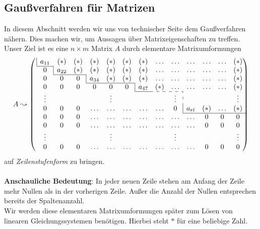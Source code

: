 \newpage

\subsection{Gaußverfahren für Matrizen}
In diesem Abschnitt werden wir uns von technischer Seite dem Gaußverfahren nähern.
Dies machen wir, um Aussagen über Matrixeigenschaften zu treffen.
Unser Ziel ist es eine $n \times m$ Matrix $A$ durch elementare Matrixumformungen 
\begin{align*}
A \leadsto
\left(\mkern3mu
    \begin{array}{*{13}c}
      \multicolumn{1}{|c}{a_{11}} & (*) & (*) & (*) & (*) & (*) & (*) & \ldots & \ldots & \ldots & \ldots & \ldots & (*) \\
      \cline{1-1}
      0 & \multicolumn{1}{|c}{a_{22}} & (*) & (*) & (*) & (*) & (*)  & \ldots & \ldots & \ldots & \ldots & \ldots & (*) \\
      \cline{2-3}
      0 & 0 & 0 & \multicolumn{1}{|c}{a_{34}} & (*) & (*) & (*) & \ldots & \ldots & \ldots & \ldots & \ldots & (*)\\
      \cline{4-6}
      0 & 0 & 0 & 0 & 0 & 0 & \multicolumn{1}{|c}{a_{47}} & (*) & \ldots & \ldots & \ldots & \ldots & (*) \\
      \cline{7-7}\cdashline{8-9}
      \vdots & & & & \vdots & & & & \vdots & \multicolumn{1}{:c}{} & & & \vdots \\
      0 & 0 & 0 & \ldots & \ldots & \ldots & \ldots & \ldots & 0 & \multicolumn{1}{|c}{a_{rl}} & (*) & \ldots & (*) \\
      \cline{10-13}
      0 & 0 & 0 & \ldots  & \ldots & \ldots & \ldots & \ldots & \ldots & \ldots & 0 & 0 & 0 \\
      0 & 0 & 0 & \ldots  & \ldots & \ldots & \ldots & \ldots & \ldots & \ldots & 0 & 0 & 0 \\
      \vdots & & & & \vdots & & & & \vdots & & & & \vdots \\
      0 & 0 & 0 & \ldots  & \ldots & \ldots & \ldots & \ldots & \ldots & \ldots & 0 & 0 & 0
    \end{array}
   \hskip-\arraycolsep\right)
\end{align*}
auf \textit{Zeilenstufenform} zu bringen.\\ \\
\textbf{Anschauliche Bedeutung}: In jeder neuen Zeile stehen am Anfang der Zeile mehr Nullen als in der vorherigen Zeile.
Außer die Anzahl der Nullen entsprechen bereits der Spaltenanzahl.\\
Wir werden diese elementaren Matrixumformungen später zum Lösen von linearen Gleichungssystemen benötigen. Hierbei steht $\ast$ für eine beliebige Zahl.
\\

